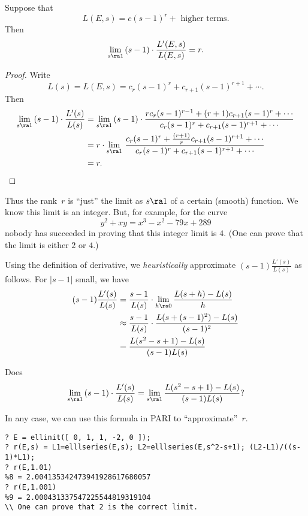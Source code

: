 \documentclass[11pt]{report}
\begin{document}
\begin{proposition}
  Suppose that
  $$
    L(E,s) = c(s-1)^r + \text{ higher terms}.
  $$
  Then
  $$
    \lim_{s\ra 1}\,
    (s-1)\cdot \frac{L'(E,s)}{L(E,s)} = r.
  $$
\end{proposition}
\begin{proof}
  Write
  $$
    L(s) = L(E,s) = c_r(s-1)^r + c_{r+1}(s-1)^{r+1} + \cdots.
  $$
  Then
  \begin{align*}
    \lim_{s\ra 1} \,
    (s-1)\cdot \frac{L'(s)}{L(s)}
     & =  \lim_{s\ra 1} \,
    (s-1)\cdot \frac{r c_r (s-1)^{r-1} + (r+1) c_{r+1}(s-1)^r + \cdots}
    {c_r(s-1)^r + c_{r+1}(s-1)^{r+1} + \cdots} \\
     & =  r\cdot \lim_{s\ra 1} \,
    \frac{c_r (s-1)^{r} + \frac{(r+1)}{r} c_{r+1}(s-1)^{r+1} + \cdots}
    {c_r(s-1)^r + c_{r+1}(s-1)^{r+1} + \cdots} \\
     & = r.
  \end{align*}
\end{proof}

Thus the rank~$r$ is ``just''
the limit as $s\ra 1$ of a certain (smooth) function.  We know this
limit is an integer.  But, for example, for the curve
$$
  y^2 +xy = x^3 - x^2 - 79x + 289
$$
nobody has succeeded in proving that this integer limit is $4$.  (One
can prove that the limit is either $2$ or $4$.)

Using the definition of derivative, we {\em heuristically} approximate
$(s-1)\frac{L'(s)}{L(s)}$ as follows.  For $|s-1|$ small, we have
\begin{align*}
  (s-1)\frac{L'(s)}{L(s)} & =
  \frac{s-1}{L(s)}\cdot \lim_{h\ra 0}  \frac{L(s+h) - L(s)}{h}      \\
                          & \approx \frac{s-1}{L(s)}\cdot
  \frac{L(s+(s-1)^2) - L(s)}{(s-1)^2}                               \\
                          & = \frac{L(s^2 - s+1) - L(s)}{(s-1)L(s)}
\end{align*}

\begin{question}
  Does
  $$
    \lim_{s\ra 1}\, (s-1)\cdot \frac{L'(s)}{L(s)}
    = \lim_{s\ra 1} \frac{L(s^2 - s+1) - L(s)}{(s-1)L(s)}?
  $$
\end{question}

\noindent In any case, we can use this formula in PARI to ``approximate''~$r$.
\begin{verbatim}
? E = ellinit([ 0, 1, 1, -2, 0 ]);
? r(E,s) = L1=elllseries(E,s); L2=elllseries(E,s^2-s+1); (L2-L1)/((s-1)*L1);
? r(E,1.01)
%8 = 2.004135342473941928617680057
? r(E,1.001)
%9 = 2.000431337547225544819319104
\\ One can prove that 2 is the correct limit.
\end{verbatim}
\end{document}
